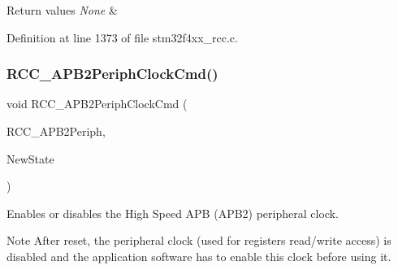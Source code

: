\begin{DoxyRetVals}{Return values}
{\em None} & \\
\hline
\end{DoxyRetVals}


Definition at line 1373 of file stm32f4xx\+\_\+rcc.\+c.

\mbox{\label{group___r_c_c_ga56ff55caf8d835351916b40dd030bc87}} 
\subsubsection{\texorpdfstring{R\+C\+C\+\_\+\+A\+P\+B2\+Periph\+Clock\+Cmd()}{RCC\_APB2PeriphClockCmd()}}
{\footnotesize\ttfamily void R\+C\+C\+\_\+\+A\+P\+B2\+Periph\+Clock\+Cmd (\begin{DoxyParamCaption}\item[{uint32\+\_\+t}]{R\+C\+C\+\_\+\+A\+P\+B2\+Periph,  }\item[{Functional\+State}]{New\+State }\end{DoxyParamCaption})}



Enables or disables the High Speed A\+PB (A\+P\+B2) peripheral clock. 

\begin{DoxyNote}{Note}
After reset, the peripheral clock (used for registers read/write access) is disabled and the application software has to enable this clock before using it. 
\end{DoxyNote}

